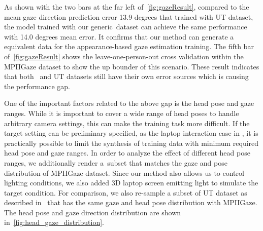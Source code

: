 As shown with the two bars at the far left of~\autoref{fig:gazeResult}, compared to the mean gaze direction prediction error 13.9 degrees that trained with UT dataset, the model trained with our generic~\dataset dataset can achieve the same performance with 14.0 degrees mean error. It confirms that our method can generate a equivalent data for the appearance-based gaze estimation training.
The fifth bar of~\autoref{fig:gazeResult} shows the leave-one-person-out cross validation within the MPIIGaze dataset to show the up bounder of this scenario.
These result indicates that both \dataset~and UT datasets still have their own error sources which is causing the performance gap.

One of the important factors related to the above gap is the head pose and gaze ranges.
While it is important to cover a wide range of head poses to handle arbitrary camera settings, this can make the training task more difficult.
If the target setting can be preliminary specified, as the laptop interaction case in \citet{zhang15_cvpr}, it is practically possible to limit the synthesis of training data with minimum required head pose and gaze ranges.
In order to analyze the effect of different head pose ranges, we additionally render a~\dataset subset that matches the gaze and pose distribution of MPIIGaze dataset.
Since our method also allows us to control lighting conditions, we also added 3D laptop screen emitting light to simulate the target condition.
For comparison, we also re-sample a subset of UT dataset as described in~\cite{zhang15_cvpr} that has the same gaze and head pose distribution with MPIIGaze.
The head pose and gaze direction distribution are shown in~\autoref{fig:head_gaze_distribution}.

